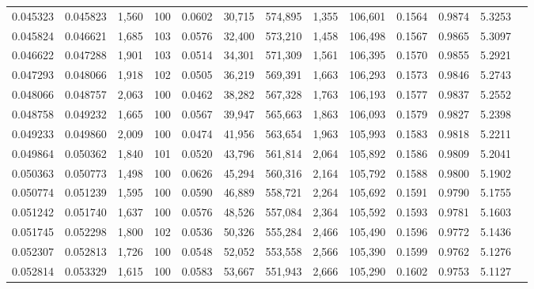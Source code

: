 \begin{tabular}{rrrrrrrrrrrrr}
0.045323 & 0.045823 & 1,560 & 100 &                                     0.0602 &  30,715 & 574,895 &   1,355 & 106,601 & 0.1564 & 0.9874 & 5.3253 \\
0.045824 & 0.046621 & 1,685 & 103 &                                     0.0576 &  32,400 & 573,210 &   1,458 & 106,498 & 0.1567 & 0.9865 & 5.3097 \\
0.046622 & 0.047288 & 1,901 & 103 &                                     0.0514 &  34,301 & 571,309 &   1,561 & 106,395 & 0.1570 & 0.9855 & 5.2921 \\
0.047293 & 0.048066 & 1,918 & 102 &                                     0.0505 &  36,219 & 569,391 &   1,663 & 106,293 & 0.1573 & 0.9846 & 5.2743 \\
0.048066 & 0.048757 & 2,063 & 100 &                                     0.0462 &  38,282 & 567,328 &   1,763 & 106,193 & 0.1577 & 0.9837 & 5.2552 \\
0.048758 & 0.049232 & 1,665 & 100 &                                     0.0567 &  39,947 & 565,663 &   1,863 & 106,093 & 0.1579 & 0.9827 & 5.2398 \\
0.049233 & 0.049860 & 2,009 & 100 &                                     0.0474 &  41,956 & 563,654 &   1,963 & 105,993 & 0.1583 & 0.9818 & 5.2211 \\
0.049864 & 0.050362 & 1,840 & 101 &                                     0.0520 &  43,796 & 561,814 &   2,064 & 105,892 & 0.1586 & 0.9809 & 5.2041 \\
0.050363 & 0.050773 & 1,498 & 100 &                                     0.0626 &  45,294 & 560,316 &   2,164 & 105,792 & 0.1588 & 0.9800 & 5.1902 \\
0.050774 & 0.051239 & 1,595 & 100 &                                     0.0590 &  46,889 & 558,721 &   2,264 & 105,692 & 0.1591 & 0.9790 & 5.1755 \\
0.051242 & 0.051740 & 1,637 & 100 &                                     0.0576 &  48,526 & 557,084 &   2,364 & 105,592 & 0.1593 & 0.9781 & 5.1603 \\
0.051745 & 0.052298 & 1,800 & 102 &                                     0.0536 &  50,326 & 555,284 &   2,466 & 105,490 & 0.1596 & 0.9772 & 5.1436 \\
0.052307 & 0.052813 & 1,726 & 100 &                                     0.0548 &  52,052 & 553,558 &   2,566 & 105,390 & 0.1599 & 0.9762 & 5.1276 \\
0.052814 & 0.053329 & 1,615 & 100 &                                     0.0583 &  53,667 & 551,943 &   2,666 & 105,290 & 0.1602 & 0.9753 & 5.1127 \\

\end{tabular}
